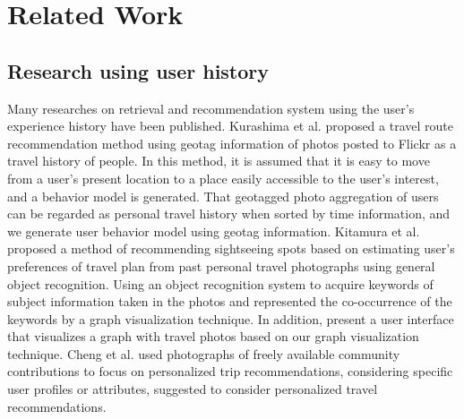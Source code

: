 \documentclass[journal]{IAENGtran}
\begin{document}
\section{Related Work}
\label{sec:Related Work}
\subsection{Research using user history}
\label{subsec:Research using user history}

Many researches on retrieval and recommendation system using the user's experience history have been published.
Kurashima et al.\cite{Codd01} proposed a travel route recommendation method using geotag information of photos posted to Flickr as a travel history of people.
In this method, it is assumed that it is easy to move from a user's present location to a place easily accessible to the user's interest, and a behavior model is generated.
That geotagged photo aggregation of users can be regarded as personal travel history when sorted by time information, and we generate user behavior model using geotag information.
Kitamura et al.\cite{Codd02} proposed a method of recommending sightseeing spots based on estimating user's preferences of travel plan from past personal travel photographs using general object recognition.
Using an object recognition system to acquire keywords of subject information taken in the photos and represented the co-occurrence of the keywords by a graph visualization technique.
In addition, present a user interface that visualizes a graph with travel photos based on our graph visualization technique.
Cheng et al.\cite{Codd03} used photographs of freely available community contributions to focus on personalized trip recommendations, considering specific user profiles or attributes, suggested to consider personalized travel recommendations.
\end{document}
